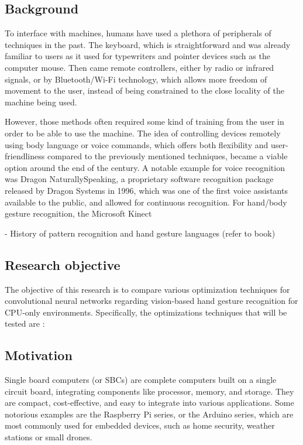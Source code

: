 \documentclass[12pt]{article}
\begin{document}
\subsection{Background}

To interface with machines, humans have used a plethora of peripherals of techniques in the past. The keyboard, which is straightforward and was already familiar to users as it used for typewriters and pointer devices such as the computer mouse. Then came remote controllers, either by radio or infrared signals, or by Bluetooth/Wi-Fi technology, which allows more freedom of movement to the user, instead of being constrained to the close locality of the machine being used.

However, those methods often required some kind of training from the user in order to be able to use the machine. The idea of controlling devices remotely using body language or voice commands, which offers both flexibility and user-friendliness compared to the previously mentioned techniques, became a viable option around the end of the century.
A notable example for voice recognition was Dragon NaturallySpeaking, a proprietary software recognition package released by Dragon Systems in 1996, which was one of the first voice assistants available to the public, and allowed for continuous recognition.
For hand/body gesture recognition, the Microsoft Kinect 

- History of pattern recognition and hand gesture languages (refer to book)

\subsection{Research objective}

The objective of this research is to compare various optimization techniques for convolutional neural networks regarding vision-based hand gesture recognition for CPU-only environments.
Specifically, the optimizations techniques that will be tested are :

\subsection{Motivation}

Single board computers (or SBCs) are complete computers built on a single circuit board, integrating components like processor, memory, and storage. They are compact, cost-effective, and easy to integrate into various applications. Some notorious examples are the Raspberry Pi series, or the Arduino series, which are most commonly used for embedded devices, such as home security, weather stations or small drones.
\end{document}
